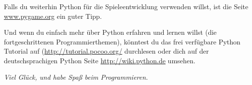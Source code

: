 

\vspace{1em}
Falls du weiterhin Python für die Spieleentwicklung verwenden willst, ist die Seite \href{http://www.pygame.org}{www.pygame.org} ein guter Tipp.

\vspace{1em}
Und wenn du einfach mehr über Python erfahren und lernen willst (die fortgeschrittenen Programmierthemen), könntest du das frei verfügbare Python Tutorial auf (\href{http://tutorial.pocoo.org/}{http://tutorial.pocoo.org/} durchlesen oder dich auf der deutschsprachigen Python Seite \href{http://wiki.python.de}{http://wiki.python.de} umsehen.

\vspace{1em}
\emph{Viel Glück, und habe Spaß beim Programmieren.}

\newpage
